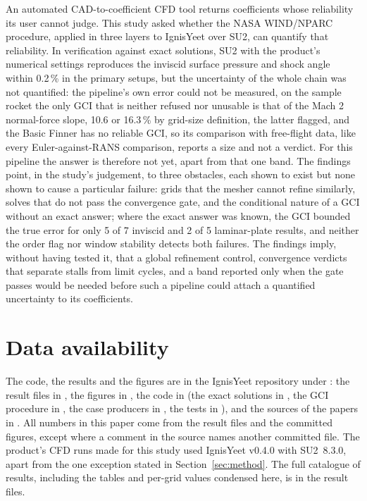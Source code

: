 \documentclass[twocolumn]{labreport}
\begin{document}
An automated CAD-to-coefficient CFD tool returns coefficients whose reliability its user cannot judge.
This study asked whether the NASA WIND/NPARC procedure, applied in three layers to IgnisYeet over SU2, can quantify that reliability.
In verification against exact solutions, SU2 with the product's numerical settings reproduces the inviscid surface pressure and shock angle within 0.2\,\% in the primary setups, but the uncertainty of the whole chain was not quantified: the pipeline's own error could not be measured, on the sample rocket the only GCI that is neither refused nor unusable is that of the Mach 2 normal-force slope, 10.6 or 16.3\,\% by grid-size definition, the latter flagged, and the Basic Finner has no reliable GCI, so its comparison with free-flight data, like every Euler-against-RANS comparison, reports a size and not a verdict.
For this pipeline the answer is therefore not yet, apart from that one band.
The findings point, in the study's judgement, to three obstacles, each shown to exist but none shown to cause a particular failure: grids that the mesher cannot refine similarly, solves that do not pass the convergence gate, and the conditional nature of a GCI without an exact answer; where the exact answer was known, the GCI bounded the true error for only 5 of 7 inviscid and 2 of 5 laminar-plate results, and neither the order flag nor window stability detects both failures.
The findings imply, without having tested it, that a global refinement control, convergence verdicts that separate stalls from limit cycles, and a band reported only when the gate passes would be needed before such a pipeline could attach a quantified uncertainty to its coefficients.

\section*{Data availability}
The code, the results and the figures are in the IgnisYeet repository under : the result files in , the figures in , the code in  (the exact solutions in , the GCI procedure in , the case producers in , the tests in ), and the sources of the papers in .
All numbers in this paper come from the result files and the committed figures, except where a comment in the source names another committed file.
The product's CFD runs made for this study used IgnisYeet v0.4.0 with SU2~8.3.0, apart from the one exception stated in Section~\ref{sec:method}.
The full catalogue of results, including the tables and per-grid values condensed here, is in the result files.
\end{document}
